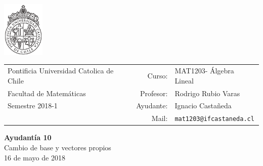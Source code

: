 \documentclass[12pt]{article}
\makeatletter
\newcommand{\ayudantia}{{\sc Ayudantía 10}}
\newcommand{\tituloayu}{Cambio de base y vectores propios}
\newcommand{\fecha}{16 de mayo de 2018}
\newcommand{\sigla}{MAT1203}
\newcommand{\nombre}{Álgebra Lineal}
\newcommand{\profesor}{Rodrigo Rubio Varas}
\newcommand{\ano}{2018}
\newcommand{\semestre}{1}
\newcommand{\mail}{mat1203@ifcastaneda.cl}
\makeatother
\begin{document}
\thispagestyle{empty}

\begin{minipage}{2cm}
	\includegraphics[width=2cm]{../../../../img/logo.pdf}
	\vspace{0.5cm}
\end{minipage}
\begin{minipage}{\linewidth}
	\begin{tabular}{lrl}
		{\scriptsize\sc Pontificia Universidad Catolica de Chile} & \hspace*{0.7in}Curso: &
		\sigla  - \nombre\\
		{\sc Facultad de Matemáticas}&
		Profesor: & \profesor \\
		{\sc Semestre \ano-\semestre} & Ayudante: & {Ignacio Castañeda}\\
		& {Mail:} & \texttt{\mail}
	\end{tabular}
\end{minipage}

\vspace{-10mm}
\begin{center}
	{\LARGE\bf \ayudantia}\\
	\vspace{0.1cm}
	{\tituloayu}\\
	\vspace{0.1cm}
	\fecha\\
	\vspace{0.4cm}
\end{center}
\end{document}
